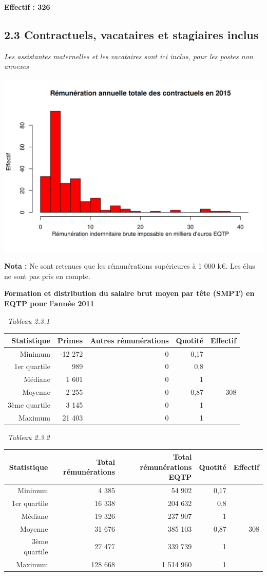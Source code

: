 \textbf{Effectif : 326 }

\hypertarget{contractuels-vacataires-et-stagiaires-inclus}{%
\subsection{2.3 Contractuels, vacataires et stagiaires
inclus}\label{contractuels-vacataires-et-stagiaires-inclus}}

\emph{Les assistantes maternelles et les vacataires sont ici inclus,
pour les postes non annexes}

\includegraphics{altair_files/figure-latex/unnamed-chunk-61-1.png}

\textbf{Nota :} Ne sont retenues que les rémunérations supérieures à 1
000 k€. Les élus ne sont pas pris en compte.

\textbf{Formation et distribution du salaire brut moyen par tête (SMPT)
en EQTP pour l'année 2011 }

~\emph{Tableau 2.3.1}

\begin{longtable}[]{@{}rrrrr@{}}
\toprule
Statistique & Primes & Autres rémunérations & Quotité &
Effectif\tabularnewline
\midrule
\endhead
Minimum & -12 272 & 0 & 0,17 &\tabularnewline
1er quartile & 989 & 0 & 0,8 &\tabularnewline
Médiane & 1 601 & 0 & 1 &\tabularnewline
Moyenne & 2 255 & 0 & 0,87 & 308\tabularnewline
3ème quartile & 3 145 & 0 & 1 &\tabularnewline
Maximum & 21 403 & 0 & 1 &\tabularnewline
\bottomrule
\end{longtable}

~\emph{Tableau 2.3.2}

\begin{longtable}[]{@{}rrrrr@{}}
\toprule
Statistique & Total rémunérations & Total rémunérations EQTP & Quotité &
Effectif\tabularnewline
\midrule
\endhead
Minimum & 4 385 & 54 902 & 0,17 &\tabularnewline
1er quartile & 16 338 & 204 632 & 0,8 &\tabularnewline
Médiane & 19 326 & 237 907 & 1 &\tabularnewline
Moyenne & 31 676 & 385 103 & 0,87 & 308\tabularnewline
3ème quartile & 27 477 & 339 739 & 1 &\tabularnewline
Maximum & 128 668 & 1 514 960 & 1 &\tabularnewline
\bottomrule
\end{longtable}

